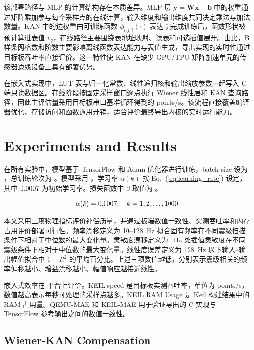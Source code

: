 \documentclass[sn-nature]{sn-jnl}
\newcommand{\wMAE}{\beta} %
\newcommand{\lr}{\alpha} %
\newcommand{\lridx}{k} %
\begin{document}
该部署路径与 MLP 的计算结构存在本质差异。MLP 层 $\mathbf{y}=\mathbf{W}\mathbf{x}+\mathbf{b}$ 中的权重通过矩阵乘加参与每个采样点的在线计算，输入维度和输出维度共同决定乘法与加法数量。KAN 中的边权重由可训练函数 $\phi_{l,j,i}(\cdot)$ 表达；完成训练后，函数形状被预计算进表值 $v_q$，在线路径主要围绕表地址映射、读表和可选插值展开。由此，B 样条网格数和阶数主要影响离线函数表达能力与表值生成，导出实现的实时性通过目标板吞吐率直接评价。这一特性使 KAN 在缺少 GPU/TPU 矩阵加速单元的传感器边缘设备上具有部署优势。

在嵌入式实现中，LUT 表与归一化常数、线性递归核和输出缩放参数一起写入 C 端只读数据区。在线阶段按固定采样窗口逐点执行 Wiener 线性层和 KAN 查询路径，因此主评估量采用目标板串口基准循环得到的 points/s。该流程直接覆盖编译器优化、存储访问和函数调用开销，适合评价最终导出内核的实时运行能力。

\FloatBarrier



\section{Experiments and Results}

在所有实验中，模型基于 TensorFlow 和 Adam 优化器进行训练，batch size 设为 \valBatchSize，总训练轮次为 \valEpochs。模型采用 \valLearningRateSchedule{}，学习率 $\lr(\lridx)$ 按 Eq.~(\ref{eq:learning_rate}) 设定，其中 $0.0007$ 为初始学习率。损失函数中 $\wMAE$ 取值为 \valMaeWeight。

\begin{equation}
    \lr(\lridx) = \valInitLR, \quad \lridx = 1, 2, \dots, \valEpochs
    \label{eq:learning_rate}
\end{equation}

本文采用三项物理指标评价补偿质量，并通过板端数值一致性、实测吞吐率和内存占用评价部署可行性。频率漂移定义为 10--128~Hz 拟合固有频率在不同震级扫描条件下相对于中位数的最大变化量。灵敏度漂移定义为 \valSensitivityCompareFreq~Hz 处插值灵敏度在不同震级条件下相对于中位数的最大变化量。线性度误差定义为 128~Hz 以下输入--输出幅值拟合中 $1-R^2$ 的平均百分比。上述三项数值越低，分别表示震级相关的频率偏移越小、增益漂移越小、幅值响应越接近线性。

嵌入式效率在 \valTargetMcu{} 平台上评价。KEIL speed 是目标板实测吞吐率，单位为 points/s，数值越高表示每秒可处理的采样点越多。KEIL RAM Usage 是 Keil 构建结果中的 RAM 占用量。QEMU-MAE 和 KEIL-MAE 用于验证导出的 C 实现与 TensorFlow 参考输出之间的数值一致性。

\subsection{Wiener-KAN Compensation}
\end{document}
